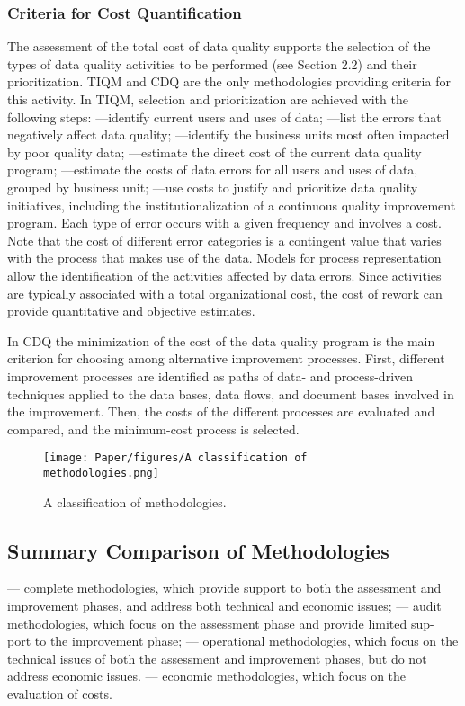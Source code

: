 \documentclass[pdftex,english,oribibl]{llncs}
\begin{document}
\subsubsection{Criteria for Cost Quantification}
The assessment of the total cost of data quality supports the selection of the types of data quality activities to be performed (see Section 2.2) and their prioritization. TIQM and CDQ are the only methodologies providing criteria for this activity. In TIQM, selection and prioritization are achieved with the following steps:
—identify current users and uses of data;
—list the errors that negatively affect data quality;
—identify the business units most often impacted by poor quality data;
—estimate the direct cost of the current data quality program;
—estimate the costs of data errors for all users and uses of data, grouped by business unit;
—use costs to justify and prioritize data quality initiatives, including the institutionalization of a continuous quality improvement program.
Each type of error occurs with a given frequency and involves a cost. Note that the cost of different error categories is a contingent value that varies with the process that makes use of the data. Models for process representation allow the identification of the activities affected by data errors. Since activities are typically associated with a total organizational cost, the cost of rework can provide quantitative and objective estimates.

In CDQ the minimization of the cost of the data quality program is the main criterion for choosing among alternative improvement processes. First, different improvement processes are identified as paths of data- and process-driven techniques applied to the data bases, data flows, and document bases involved in the improvement. Then, the costs of the different processes are evaluated and compared, and the minimum-cost
process is selected.


  \begin{figure}
    \centering
    \texttt{[image: Paper/figures/A classification of methodologies.png]}
    \caption{A classification of methodologies.}
    \label{fig:classificationMethodologies}
  \end{figure}

\subsection{Summary Comparison of Methodologies}
— complete methodologies, which provide support to both the assessment and improvement phases, and address both technical and economic issues;
— audit methodologies, which focus on the assessment phase and provide limited sup-
port to the improvement phase;
— operational methodologies, which focus on the technical issues of both the assessment and improvement phases, but do not address economic issues.
— economic methodologies, which focus on the evaluation of costs.
\end{document}
